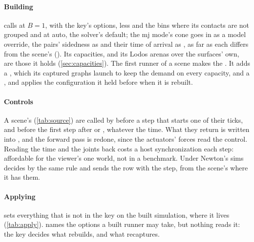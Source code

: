 \paragraph{Building}  calls  at $B = 1$, with the key's options, less  and the bins where its contacts are not grouped and  at auto, the solver's default; the mj mode's cone goes in as a model override, the pairs' sidedness as  and their time of arrival as , as far as each differs from the scene's (). Its capacities, and its Lodos arenas over the surfaces' own, are those it holds (\cref{sec:capacities}). The first runner of a scene makes the . It adds a , which its captured graphs launch to keep the demand on every capacity, and a , and applies the configuration it held before when it is rebuilt.

\paragraph{Controls} A scene's  (\cref{tab:source}) are called by  before a step that starts one of their ticks, and before the first step after  or , whatever the time. What they return is written into , and the forward pass is redone, since the actuators' forces read the control. Reading the time and the joints back costs a host synchronization each step: affordable for the viewer's one world, not in a benchmark. Under Newton's sims  decides by the same rule and sends the row with the step, from the scene's  where it has them.

\paragraph{Applying}  sets everything that is not in the key on the built simulation, where it lives (\cref{tab:apply}).  names the options a built runner may take, but nothing reads it: the key decides what rebuilds, and  what recaptures.

